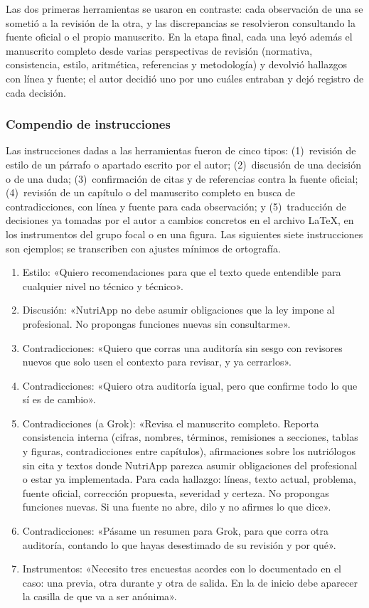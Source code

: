 \documentclass[12pt, a4paper]{article}
\begin{document}
Las dos primeras herramientas se usaron en contraste: cada observación
de una se sometió a la revisión de la otra, y las discrepancias se
resolvieron consultando la fuente oficial o el propio manuscrito. En la
etapa final, cada una leyó además el manuscrito completo desde varias
perspectivas de revisión (normativa, consistencia, estilo, aritmética,
referencias y metodología) y devolvió hallazgos con línea y fuente; el
autor decidió uno por uno cuáles entraban y dejó registro de cada
decisión.
 
\subsubsection*{Compendio de instrucciones}
 
Las instrucciones dadas a las herramientas fueron de cinco tipos:
(1)~revisión de estilo de un párrafo o apartado escrito por el autor;
(2)~discusión de una decisión o de una duda; (3)~confirmación de citas y
de referencias contra la fuente oficial; (4)~revisión de un capítulo o
del manuscrito completo en busca de contradicciones, con línea y fuente
para cada observación; y (5)~traducción de decisiones ya tomadas por el
autor a cambios concretos en el archivo \LaTeX{}, en los instrumentos
del grupo focal o en una figura. Las siguientes siete instrucciones
son ejemplos; se transcriben con ajustes mínimos de ortografía.
 
\begin{enumerate}
 \item Estilo: «Quiero recomendaciones para
    que el texto quede entendible
    para cualquier
    nivel no técnico y técnico».
  \item Discusión: «NutriApp no debe asumir obligaciones que la ley
    impone al profesional. No propongas funciones nuevas sin
    consultarme».
  \item Contradicciones: «Quiero que corras una auditoría sin sesgo con
    revisores nuevos que solo usen el contexto para revisar, y ya
    cerrarlos».
  \item Contradicciones: «Quiero otra auditoría igual, pero que confirme
    todo lo que sí es de cambio».
  \item Contradicciones (a Grok): «Revisa el manuscrito completo.
    Reporta consistencia interna (cifras, nombres, términos, remisiones
    a secciones, tablas y figuras, contradicciones entre capítulos),
    afirmaciones sobre los nutriólogos sin cita y textos donde NutriApp
    parezca asumir obligaciones del profesional o estar ya
    implementada. Para cada hallazgo: líneas, texto actual, problema,
    fuente oficial, corrección propuesta, severidad y certeza. No
    propongas funciones nuevas. Si una fuente no abre, dilo y no
    afirmes lo que dice».
  \item Contradicciones: «Pásame un resumen para Grok, para que corra
    otra auditoría, contando lo que hayas desestimado de su revisión y
    por qué».
  \item Instrumentos: «Necesito tres encuestas acordes con lo
    documentado en el caso: una previa, otra durante y otra de salida.
    En la de inicio debe aparecer la casilla de que va a ser anónima».
\end{enumerate}
 
\end{document}
